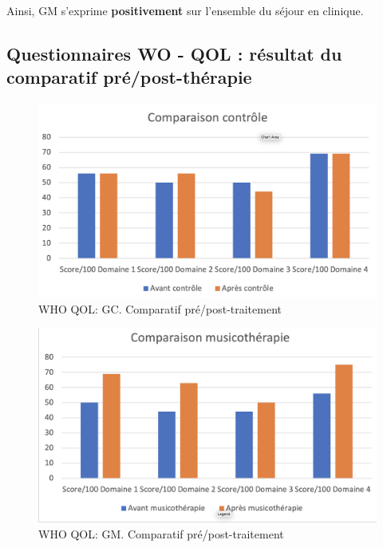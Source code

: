                  Ainsi,  GM s'exprime
                 \textbf{positivement}
                 sur l'ensemble du séjour en clinique.

                 \subsection{Questionnaires WO - QOL : résultat du comparatif pré/post-thérapie}



\begin{figure}
\centering
\includegraphics[width=\linewidth]{images/Compcontrole.png}
\caption[Schéma du déroulement]{WHO QOL:  GC. Comparatif pré/post-traitement}

\end{figure}

\begin{figure}
\centering
\includegraphics[width=1.0\linewidth]{images/Compmusico.png}
\caption[Schéma du déroulement]{ WHO QOL: GM. Comparatif pré/post-traitement }

\end{figure}


